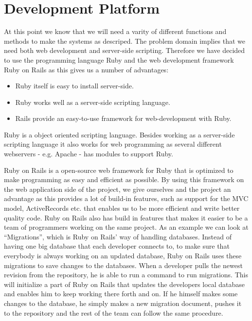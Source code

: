 \section{Development Platform}
At this point we know that we will need a varity of different functions and methods to make the systems as descriped.
The problem domain implies that we need both web development and server-side scripting. 
Therefore we have decided to use the programming language Ruby and the web development framework Ruby on Rails as this gives us a number of advantages:

\begin{itemize}
	\item Ruby itself is easy to install server-side.
	\item Ruby works well as a server-side scripting language.
	\item Rails provide an easy-to-use framework for web-development with Ruby.
\end{itemize}

Ruby is a object oriented scripting language.
Besides working as a server-side scripting language it also works for web programming as several different webservers - e.g. Apache - has modules to support Ruby. 

Ruby on Rails is a open-source web framework for Ruby that is optimized to make programming as easy and efficient as possible. 
By using this framework on the web application side of the project, we give ourselves and the project an advantage as this provides a lot of build-in features, such as support for the MVC model, ActiveRecords etc. that enables us to be more efficient and write better quality code.
Ruby on Rails also has build in features that makes it easier to be a team of programmers working on the same project.
As an example we can look at ``Migrations'', which is Ruby on Rails' way of handling databases.
Instead of having one big database that each developer connects to, to make sure that everybody is always working on an updated database, Ruby on Rails uses these migrations to save changes to the databases.
When a developer pulls the newest revision from the repository, he is able to run a command to run migrations.
This will initialize a part of Ruby on Rails that updates the developers local database and enables him to keep working there forth and on. 
If he himself makes some changes to the database, he simply makes a new migration document, pushes it to the repository and the rest of the team can follow the same procedure. 

